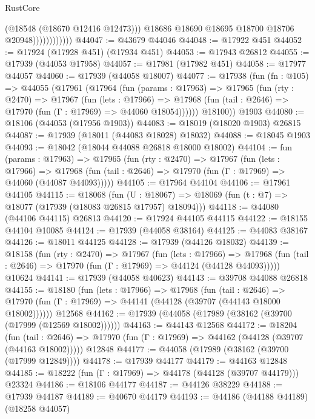 \begin{lexlean}{RustCore}
\begin{coremodule}
                              (@18548 (@18670 @12416 @12473)))
                            @18686
                            @18690
                            @18695
                            @18700
                            @18706
                            @20948))))))))))))
@44047 := @43679 @44046
@44048 := @17922 @451
@44052 := @17924 (@17928 @451) (@17934 @451)
@44053 := @17943 @26812
@44055 := @17939 (@44053 @17958)
@44057 := @17981 (@17982 @451)
@44058 := @17977 @44057
@44060 := @17939 (@44058 @18007)
@44077 := @17938
    (fun (fn : @105) =>
    @44055
      (@17961
        (@17964
          (fun (params : @17963) =>
          @17965
            (fun (rty : @2470) =>
            @17967
              (fun (lets : @17966) =>
              @17968 (fun (tail : @2646) => @17970 (fun (Γ : @17969) => @44060 @18054))))))
        @18100))
    @1903
@44080 := @18106 (@44053 (@17956 @1903))
@44083 := @18019 (@18020 @1903) @26815
@44087 := @17939 (@18011 (@44083 @18028) @18032)
@44088 := @18045 @1903
@44093 := @18042 (@18044 @44088 @26818 @18000 @18002)
@44104 := fun (params : @17963) =>
  @17965
    (fun (rty : @2470) =>
    @17967
      (fun (lets : @17966) =>
      @17968 (fun (tail : @2646) => @17970 (fun (Γ : @17969) => @44060 (@44087 @44093)))))
@44105 := @17964 @44104
@44106 := @17961 @44105
@44115 := @18068
    (fun (U : @18067) => @18069 (fun (t : @7) => @18077 (@17939 (@18083 @26815 @17957) @18094)))
@44118 := @44080 (@44106 @44115) @26813
@44120 := @17924 @44105 @44115
@44122 := @18155 @44104 @10085
@44124 := @17939 (@44058 @38164)
@44125 := @44083 @38167
@44126 := @18011 @44125
@44128 := @17939 (@44126 @18032)
@44139 := @18158
    (fun (rty : @2470) =>
    @17967
      (fun (lets : @17966) =>
      @17968 (fun (tail : @2646) => @17970 (fun (Γ : @17969) => @44124 (@44128 @44093)))))
    @10624
@44141 := @17939 (@44058 @40623)
@44143 := @39708 @44088 @26818
@44155 := @18180
    (fun (lets : @17966) =>
    @17968
      (fun (tail : @2646) =>
      @17970 (fun (Γ : @17969) => @44141 (@44128 (@39707 (@44143 @18000 @18002))))))
    @12568
@44162 := @17939 (@44058 (@17989 (@38162 (@39700 (@17999 (@12569 @18002))))))
@44163 := @44143 @12568
@44172 := @18204
    (fun (tail : @2646) => @17970 (fun (Γ : @17969) => @44162 (@44128 (@39707 (@44163 @18002)))))
    @12848
@44177 := @44058 (@17989 (@38162 (@39700 (@17999 @12849))))
@44178 := @17939 @44177
@44179 := @44163 @12848
@44185 := @18222 (fun (Γ : @17969) => @44178 (@44128 (@39707 @44179))) @23324
@44186 := @18106 @44177
@44187 := @44126 @38229
@44188 := @17939 @44187
@44189 := @40670 @44179
@44193 := @44186 (@44188 @44189) (@18258 @44057)

\end{coremodule}
\end{lexlean}

